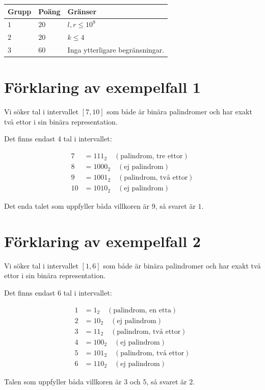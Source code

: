 \noindent
\begin{tabular}{| l | l | p{12cm} |}
  \hline
  \textbf{Grupp} & \textbf{Poäng} & \textbf{Gränser} \\ \hline
  $1$    & $20$       & $l,r \leq 10^9$ \\ \hline
  $2$    & $20$       & $k \leq 4$ \\ \hline
  $3$    & $60$       & Inga ytterligare begränsningar. \\ \hline
\end{tabular}

\section*{Förklaring av exempelfall 1}

Vi söker tal i intervallet $[7, 10]$ som både är binära palindromer och har exakt två ettor i sin binära representation.

Det finns endast 4 tal i intervallet:

\begin{align*}
7 &= 111_2 \quad (\text{palindrom, tre ettor}) \\
8 &= 1000_2 \quad (\text{ej palindrom}) \\
9 &= 1001_2 \quad (\text{palindrom, två ettor}) \\
10 &= 1010_2 \quad (\text{ej palindrom})
\end{align*}

Det enda talet som uppfyller båda villkoren är $9$, så svaret är $1$.

\section*{Förklaring av exempelfall 2}

Vi söker tal i intervallet $[1, 6]$ som både är binära palindromer och har exakt två ettor i sin binära representation.

Det finns endast 6 tal i intervallet:

\begin{align*}
1 &= 1_2 \quad (\text{palindrom, en etta}) \\
2 &= 10_2 \quad (\text{ej palindrom}) \\
3 &= 11_2 \quad (\text{palindrom, två ettor}) \\
4 &= 100_2 \quad (\text{ej palindrom}) \\
5 &= 101_2 \quad (\text{palindrom, två ettor}) \\
6 &= 110_2 \quad (\text{ej palindrom})
\end{align*}

Talen som uppfyller båda villkoren är $3$ och $5$, så svaret är $2$.
